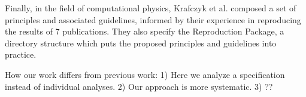 Finally, in the field of computational physics, Krafczyk et al. \cite{krafczykLearningReproducingComputational2021} composed a set of principles and associated guidelines, informed by their experience in reproducing the results of 7 publications. They also specify the Reproduction Package, a directory structure which puts the proposed principles and guidelines into practice.

How our work differs from previous work: 1) Here we analyze a specification instead of individual analyses. 2) Our approach is more systematic. 3) ??




\begin{itemize}

\end{itemize}